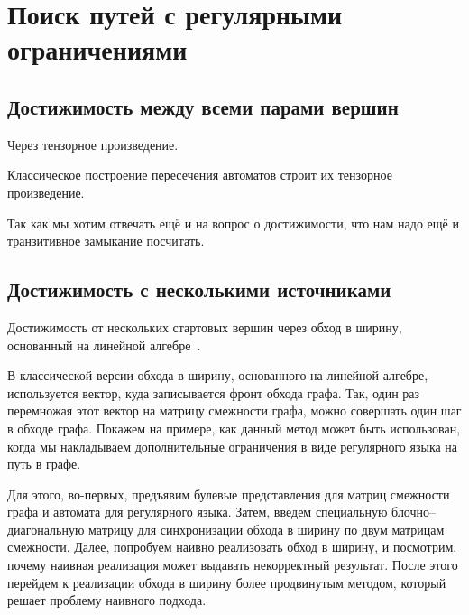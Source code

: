 \chapter{Поиск путей с регулярными ограничениями}

\section{Достижимость между всеми парами вершин}

Через тензорное произведение.

Классическое построение пересечения автоматов строит их тензорное произведение.

Так как мы хотим отвечать ещё и на вопрос о достижимости, что нам надо ещё и транзитивное замыкание посчитать.

\section{Достижимость с несколькими источниками}

Достижимость от нескольких стартовых вершин через обход в ширину, основанный на линейной алгебре~\cite{9286186}.

В классической версии обхода в ширину, основанного на линейной алгебре, используется вектор, куда записывается фронт обхода графа.
Так, один раз перемножая этот вектор на матрицу смежности графа, можно совершать один шаг в обходе графа.
Покажем на примере, как данный метод может быть использован, когда мы накладываем дополнительные ограничения в виде регулярного языка на путь в графе. 

Для этого, во-первых, предъявим булевые представления для матриц смежности графа и автомата для регулярного языка. Затем, введем специальную блочно--диагональную матрицу 
для синхронизации обхода в ширину по двум матрицам смежности. Далее, попробуем наивно реализовать обход в ширину, и посмотрим, почему наивная реализация
может выдавать некорректный результат.
После этого перейдем к реализации обхода в ширину более продвинутым методом, который решает проблему наивного подхода.

